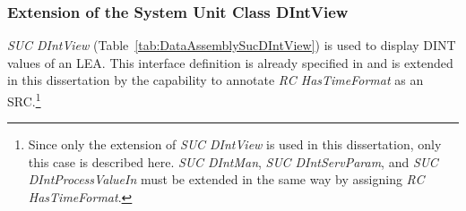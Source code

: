 \subsubsection{Extension of the System Unit Class DIntView}

\emph{SUC DIntView} (Table~\ref{tab:DataAssemblySucDIntView}) is used to display DINT values of an LEA. This interface definition is already specified in \cite{PNO.2025.Part3} and is extended in this dissertation by the capability to annotate \emph{RC HasTimeFormat} as an SRC.\footnote{Since only the extension of \emph{SUC DIntView} is used in this dissertation, only this case is described here. \emph{SUC DIntMan}, \emph{SUC DIntServParam}, and \emph{SUC DIntProcessValueIn} must be extended in the same way by assigning \emph{RC HasTimeFormat}.}

